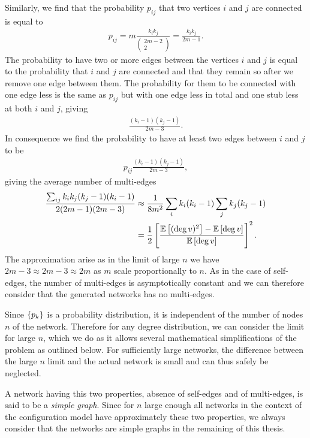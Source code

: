 \documentclass[
11pt, %
english, %
singlespacing, %
liststotoc, %
headsepline, %
]{MastersDoctoralThesis} %
\begin{document}
Similarly, we find that the probability $p_{ij}$ that two vertices $i$ and $j$ are connected is equal to
\begin{align}
	p_{ij} = m \frac{k_i k_j}{ \begin{pmatrix} 2m - 2 \\ 2 \end{pmatrix} } = \frac{k_i k_j}{2 m -1}.
\end{align}
The probability to have two or more edges between the vertices $i$ and $j$ is equal to the probability that $i$ and $j$ are connected and that they remain so after we remove one edge between them. The probability for them to be connected with one edge less is the same as $p_{ij}$ but with one edge less in total and one stub less at both $i$ and $j$, giving
\begin{align}
	\frac{(k_i - 1)(k_j - 1)}{2 m - 3}.
\end{align}
In consequence we find the probability to have at least two edges between $i$ and $j$ to be
\begin{align}
	p_{ij} \frac{(k_i - 1)(k_j - 1)}{2 m - 3},
\end{align}
giving the average number of multi-edges
\begin{align}
	\frac{\sum_{ij} k_i k_j (k_j - 1) (k_i - 1)}{2 (2 m - 1)(2 m - 3)}  &\approx \frac{1}{8 m^2} \sum_i k_i(k_i - 1) \sum_j k_j(k_j - 1) \\
	&= \frac{1}{2}\left[ \frac{\mathbb{E}\left[ (\deg{v})^2 \right] - \mathbb{E}\left[ \deg{v} \right]}{\mathbb{E}\left[ \deg{v} \right]} \right]^2.
\end{align}
The approximation arise as in the limit of large $n$ we have $2 m - 3 \approx 2 m - 3 \approx 2 m$ as $m$ scale proportionally to $n$. As in the case of self-edges, the number of multi-edges is asymptotically constant and we can therefore consider that the generated networks has no multi-edges.

Since $\{p_k\}$ is a probability distribution, it is independent of the number of nodes $n$ of the network. Therefore for any degree distribution, we can consider the limit for large $n$, which we do as it allows several mathematical simplifications of the problem as outlined below. For sufficiently large networks, the difference between the large $n$ limit and the actual network is small and can thus safely be neglected.

A network having this two properties, absence of self-edges and of multi-edges, is said to be a \emph{simple graph}. Since for $n$ large enough all networks in the context of the configuration model have approximately these two properties, we always consider that the networks are simple graphs in the remaining of this thesis.
\end{document}
